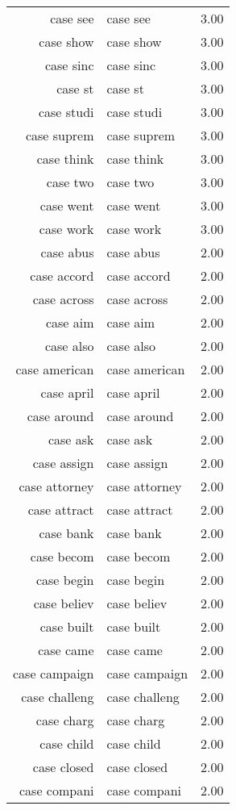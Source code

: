 \begin{table}[ht]
\begin{tabular}{rlr}
  case see & case see & 3.00 \\ 
  case show & case show & 3.00 \\ 
  case sinc & case sinc & 3.00 \\ 
  case st & case st & 3.00 \\ 
  case studi & case studi & 3.00 \\ 
  case suprem & case suprem & 3.00 \\ 
  case think & case think & 3.00 \\ 
  case two & case two & 3.00 \\ 
  case went & case went & 3.00 \\ 
  case work & case work & 3.00 \\ 
  case abus & case abus & 2.00 \\ 
  case accord & case accord & 2.00 \\ 
  case across & case across & 2.00 \\ 
  case aim & case aim & 2.00 \\ 
  case also & case also & 2.00 \\ 
  case american & case american & 2.00 \\ 
  case april & case april & 2.00 \\ 
  case around & case around & 2.00 \\ 
  case ask & case ask & 2.00 \\ 
  case assign & case assign & 2.00 \\ 
  case attorney & case attorney & 2.00 \\ 
  case attract & case attract & 2.00 \\ 
  case bank & case bank & 2.00 \\ 
  case becom & case becom & 2.00 \\ 
  case begin & case begin & 2.00 \\ 
  case believ & case believ & 2.00 \\ 
  case built & case built & 2.00 \\ 
  case came & case came & 2.00 \\ 
  case campaign & case campaign & 2.00 \\ 
  case challeng & case challeng & 2.00 \\ 
  case charg & case charg & 2.00 \\ 
  case child & case child & 2.00 \\ 
  case closed & case closed & 2.00 \\ 
  case compani & case compani & 2.00 \\ 

\end{tabular}
\end{table}
